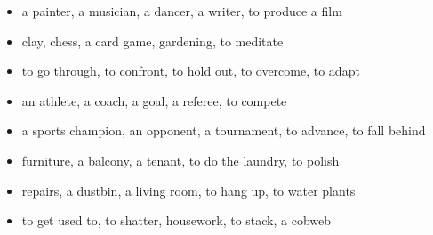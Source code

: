 \begin{itemize}
\raggedright
  \item a painter, a musician, a dancer, a writer, to produce a film
  \item clay, chess, a card game, gardening, to meditate
  \item to go through, to confront, to hold out, to overcome, to adapt
  \item an athlete, a coach, a goal, a referee, to compete
  \item a sports champion, an opponent, a tournament, to advance, to fall behind
  \item furniture, a balcony, a tenant, to do the laundry, to polish
  \item repairs, a dustbin, a living room, to hang up, to water plants
  \item to get used to, to shatter, housework, to stack, a cobweb
\end{itemize}

